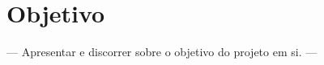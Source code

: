 



\section{Objetivo}
\label{sec:objetivo}

 — Apresentar e discorrer sobre o objetivo do projeto em si. — 


   
